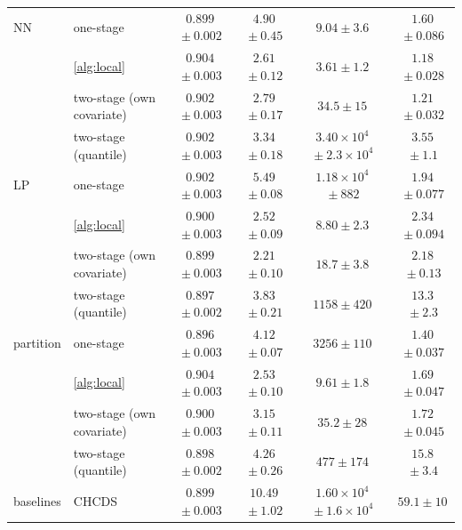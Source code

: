 \begin{table}[!t]
{\begin{tabular}{llcccc}
\addlinespace[2pt]
NN & one-stage & $0.899${\scriptsize${}\pm0.002$} & $4.90${\scriptsize${}\pm0.45$} & $9.04${\scriptsize${}\pm3.6$} & $1.60${\scriptsize${}\pm0.086$}\\
 & \cref{alg:local} & $0.904${\scriptsize${}\pm0.003$} & $2.61${\scriptsize${}\pm0.12$} & $3.61${\scriptsize${}\pm1.2$} & $1.18${\scriptsize${}\pm0.028$}\\
 & two-stage (own covariate) & $0.902${\scriptsize${}\pm0.003$} & $2.79${\scriptsize${}\pm0.17$} & $34.5${\scriptsize${}\pm15$} & $1.21${\scriptsize${}\pm0.032$}\\
 & two-stage (quantile) & $0.902${\scriptsize${}\pm0.003$} & $3.34${\scriptsize${}\pm0.18$} & $3.40\times10^{4}${\scriptsize${}\pm2.3\times10^{4}$} & $3.55${\scriptsize${}\pm1.1$}\\
\addlinespace[2pt]
LP & one-stage & $0.902${\scriptsize${}\pm0.003$} & $5.49${\scriptsize${}\pm0.08$} & $1.18\times10^{4}${\scriptsize${}\pm882$} & $1.94${\scriptsize${}\pm0.077$}\\
 & \cref{alg:local} & $0.900${\scriptsize${}\pm0.003$} & $2.52${\scriptsize${}\pm0.09$} & $8.80${\scriptsize${}\pm2.3$} & $2.34${\scriptsize${}\pm0.094$}\\
 & two-stage (own covariate) & $0.899${\scriptsize${}\pm0.003$} & $2.21${\scriptsize${}\pm0.10$} & $18.7${\scriptsize${}\pm3.8$} & $2.18${\scriptsize${}\pm0.13$}\\
 & two-stage (quantile) & $0.897${\scriptsize${}\pm0.002$} & $3.83${\scriptsize${}\pm0.21$} & $1158${\scriptsize${}\pm420$} & $13.3${\scriptsize${}\pm2.3$}\\
\addlinespace[2pt]
partition & one-stage & $0.896${\scriptsize${}\pm0.003$} & $4.12${\scriptsize${}\pm0.07$} & $3256${\scriptsize${}\pm110$} & $1.40${\scriptsize${}\pm0.037$}\\
 & \cref{alg:local} & $0.904${\scriptsize${}\pm0.003$} & $2.53${\scriptsize${}\pm0.10$} & $9.61${\scriptsize${}\pm1.8$} & $1.69${\scriptsize${}\pm0.047$}\\
 & two-stage (own covariate) & $0.900${\scriptsize${}\pm0.003$} & $3.15${\scriptsize${}\pm0.11$} & $35.2${\scriptsize${}\pm28$} & $1.72${\scriptsize${}\pm0.045$}\\
 & two-stage (quantile) & $0.898${\scriptsize${}\pm0.002$} & $4.26${\scriptsize${}\pm0.26$} & $477${\scriptsize${}\pm174$} & $15.8${\scriptsize${}\pm3.4$}\\
\addlinespace[2pt]
baselines & CHCDS & $0.899${\scriptsize${}\pm0.003$} & $10.49${\scriptsize${}\pm1.02$} & $1.60\times10^{4}${\scriptsize${}\pm1.6\times10^{4}$} & $59.1${\scriptsize${}\pm10$}\\

\end{tabular}}
\end{table}
